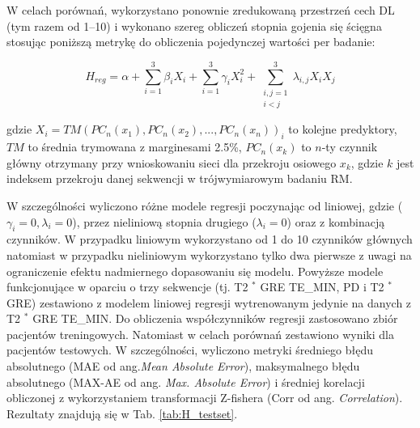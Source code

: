 W celach porównań, wykorzystano ponownie zredukowaną przestrzeń cech DL (tym razem od 1--10) i wykonano szereg obliczeń stopnia gojenia się ścięgna stosując poniższą metrykę do obliczenia pojedynczej wartości per badanie: 

\begin{equation}
H_{reg} = \alpha + \sum_{i=1}^{3}\beta_{i}X_{i} + \sum_{i=1}^{3}\gamma_{i}X_{i}^{2} +
\sum_{\substack{i, j = 1\\ i < j}}^{3}\lambda_{i,j}X_{i}X_{j}
\end{equation}

gdzie $X_i = TM(PC_n(x_1), PC_n(x_2),..., PC_n(x_n))_{i}$ to kolejne predyktory, $TM$ to średnia trymowana z marginesami 2.5\%, $PC_n(x_k)$ to $n$-ty czynnik główny otrzymany przy wnioskowaniu sieci dla przekroju osiowego $x_k$, gdzie $k$ jest indeksem przekroju danej sekwencji w trójwymiarowym badaniu RM.

W szczególności wyliczono różne modele regresji poczynając od liniowej, gdzie ($\gamma_{i}=0, \lambda_{i}=0$), przez nieliniową stopnia drugiego ($\lambda_{i}=0$) oraz z kombinacją czynników. W przypadku liniowym wykorzystano od 1 do 10 czynników głównych natomiast w przypadku nieliniowym wykorzystano tylko dwa pierwsze z uwagi na ograniczenie efektu nadmiernego dopasowaniu się modelu. Powyższe modele funkcjonujące w oparciu o trzy sekwencje (tj. T2 $^\ast$ GRE TE\_MIN, PD i T2 $^\ast$ GRE) zestawiono z modelem liniowej regresji wytrenowanym jedynie na danych z T2 $^\ast$ GRE TE\_MIN. Do obliczenia współczynników regresji zastosowano zbiór pacjentów treningowych. Natomiast w celach porównań zestawiono wyniki dla pacjentów testowych. W szczególności, wyliczono metryki średniego błędu absolutnego (MAE od ang.\textit{Mean Absolute Error}), maksymalnego błędu absolutnego (MAX-AE od ang. \textit{Max. Absolute Error}) i średniej korelacji obliczonej z wykorzystaniem transformacji Z-fishera (Corr od ang. \textit{Correlation}). Rezultaty znajdują się w Tab. \ref{tab:H_testset}.

